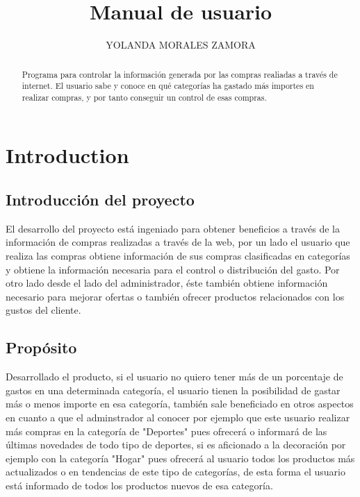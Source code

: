 \documentclass{article}
\title{Manual de usuario}
\author{YOLANDA MORALES ZAMORA}
\begin{document}
\maketitle
{}
\begin{abstract}
\textcolor{Micolor1}{Programa para controlar la información generada por las compras realiadas a través de internet. El usuario sabe y conoce en qué categorías ha gastado más importes en realizar compras, y por tanto conseguir un control de esas compras}.
\end{abstract}


\section{Introduction}
\subsection{Introducción del proyecto}
El desarrollo del proyecto está ingeniado para obtener beneficios a través de la información de compras realizadas a través de la web, por un lado el usuario que realiza las compras obtiene información de sus compras clasificadas en categorías y obtiene la información necesaria para el control o distribución del gasto. Por otro lado desde el lado del administrador, éste también obtiene información necesario para mejorar ofertas o también ofrecer productos relacionados con los gustos del cliente.
\subsection{Propósito}
Desarrollado el producto, si el usuario no quiero tener más de un porcentaje de gastos en una determinada categoría, el usuario tienen la posibilidad de gastar más o menos importe en esa categoría, también sale beneficiado en otros aspectos en cuanto a que el adminstrador al conocer por ejemplo que este usuario realizar más compras en la categoría de "Deportes" pues ofrecerá o informará de las últimas novedades de todo tipo de deportes, si es aficionado a la decoración por ejemplo con la categoría "Hogar" pues ofrecerá al usuario todos los productos más actualizados o en tendencias de este tipo de categorías, de esta forma el usuario está informado de todos los productos nuevos de esa categoría.
\end{document}
